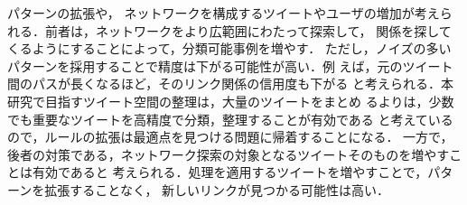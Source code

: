 \documentclass[japanese]{jnlp_1.4}
\newcommand{\addspan}[1]{}
\begin{document}
\addspan{
ネットワーク拡張手法について，図\ref{fig:direct_repqt}から図
\ref{fig:RT_and_repqt}の各パターンごとの分類性能を表\ref{tab:各パターンの精度}に示す．表の各列は，各パターンを単独で使用して，ツイートa，b間の関係
を分類した場合の分類精度を示している．
ただし，両方をリツイートするパターン（図\ref{fig:both_RT}）は，
それぞれのツイートをリツイートしたユーザ集合間のジャッカード係数を同意のスコアとするものであるため，
閾値0.01以上の場合のみ同意と判定することとしている．
このとき，直接返信のパターン（図
\ref{fig:direct_repqt}）は，返信態度の分類器をそのまま適用した場合と同等
である．反論関係は「福島から避難した子供には教科書が配布されない」に対し
て1件の誤分類が存在するのみであったが，同意関係への分類精度はマクロ平均で
0.953と高かった．次に，拡張した各パターンの結果について，まず，両方をリツ
イートするパターン（図\ref{fig:both_RT}）について，本研究ではリツイートは同意関係であるという仮定を置いているため，
本パターンでは反論関係への分類は行われない．同意関係への分類精度は比較的
高く，本パターンの有効性が示されている．今後は，リツイート後のツイートも
参照し，同意関係ではないリツイートも考慮することで，同意関係の分類精度向
上，反論関係への分類も行うことが考えられる．
次に，他のツイートで返信のパターン（図\ref{fig:other_repqt}）は，適合する
場合が少なかっために，分類された事例も少なかった．分類性能は，反論事例の
分類精度が最も高かったが，分類された事例数が少ないことが問題である．
最後に，片方をリツイート・もう片方に返信のパターンは，分類された事例は
同意・反論とも多かった．
分類精度については，同意関係は，両方をリツイートするパターン・他のツイー
トで返信するパターンと同程度の精度で分類することができたが，
反論関係の分類精度はあまり高くなかった．
}

\addspan{ネットワーク拡張手法の分類性能を向上させるためには，}パターンの拡張や，
ネットワークを構成するツイートやユーザの増加が考えられる．前者は，ネットワークをより広範囲にわたって探索して，
関係を探してくるようにすることによって，分類可能事例を増やす．
ただし，ノイズの多いパターンを採用することで精度は下がる可能性が高い．例
えば，元のツイート間のパスが長くなるほど，そのリンク関係の信用度も下がる
と考えられる．本研究で目指すツイート空間の整理は，大量のツイートをまとめ
るよりは，少数でも重要なツイートを高精度で分類，整理することが有効である
と考えているので，ルールの拡張は最適点を見つける問題に帰着することになる．
一方で，後者の対策である，ネットワーク探索の対象となるツイートそのものを増やすことは有効であると
考えられる．処理を適用するツイートを増やすことで，パターンを拡張することなく，
新しいリンクが見つかる可能性は高い．
\end{document}
